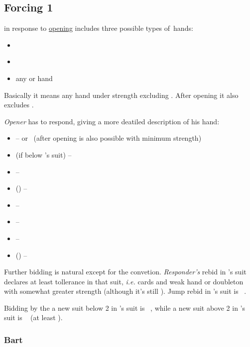\subsection{Forcing 1\nt}
\label{subsec:1nt-fc}

 in response to \hyperref[subsec:1maj-op]{\ctr{1\major} opening} includes three possible types
of~hands:
\begin{itemize}
  \item \so\  \ws{}
  \item \inv\  \ws{}
  \item any \so\/ or \inv\/ hand \wos{}
\end{itemize}

Basically it means any hand under \gf\/ strength excluding  \ws{}. After \ctr{1\h} opening it also excludes
. \pagebreak[2]

\emph{Opener}\/ has to respond, giving a more deatiled description of his hand:
\begin{itemize}
  \item \ctr{2\c} --  or \bal\ (after \ctr{1\h} opening  is also possible with minimum strength)
  \item \ctr{2\d/\h} (if below \opn's suit) -- 
  \item {} --  
  \item \ctr{2\s} (\om) -- \rev\ 
  \item \ctr{2\nt} --  \bal
  \item \ctr{3\minor/\h} -- \rev\ 
  \item {} --  
  \item \ctr{3\s} (\om) --  \question
\end{itemize}

Further bidding is natural except for the \hyperref[subsec:bart]{} convetion. \emph{Responder's}
rebid in \opn's suit declares at least tollerance in that suit, \textit{i.e.}  cards and weak hand or
doubleton with somewhat greater strength (although it's still \so). Jump rebid in \opn's suit is \inv\ \ws{}.

Bidding by the \resp\/ a new suit below 2 in \opn's suit is \nat\ \so, while a new suit above 2 in \opn's suit is
\nat\ \inv\/ (at least ).

\subsubsection{Bart}
\label{subsec:bart}

